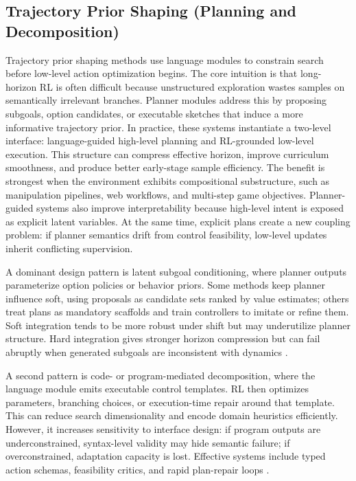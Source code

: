 \documentclass[pdflatex,sn-mathphys-num]{sn-jnl}
\begin{document}
\subsection{Trajectory Prior Shaping (Planning and Decomposition)}
Trajectory prior shaping methods use language modules to constrain search before low-level action optimization begins. The core intuition is that long-horizon RL is often difficult because unstructured exploration wastes samples on semantically irrelevant branches. Planner modules address this by proposing subgoals, option candidates, or executable sketches that induce a more informative trajectory prior. In practice, these systems instantiate a two-level interface: language-guided high-level planning and RL-grounded low-level execution. This structure can compress effective horizon, improve curriculum smoothness, and produce better early-stage sample efficiency. The benefit is strongest when the environment exhibits compositional substructure, such as manipulation pipelines, web workflows, and multi-step game objectives. Planner-guided systems also improve interpretability because high-level intent is exposed as explicit latent variables. At the same time, explicit plans create a new coupling problem: if planner semantics drift from control feasibility, low-level updates inherit conflicting supervision.

A dominant design pattern is latent subgoal conditioning, where planner outputs parameterize option policies or behavior priors. Some methods keep planner influence soft, using proposals as candidate sets ranked by value estimates; others treat plans as mandatory scaffolds and train controllers to imitate or refine them. Soft integration tends to be more robust under shift but may underutilize planner structure. Hard integration gives stronger horizon compression but can fail abruptly when generated subgoals are inconsistent with dynamics \cite{arxiv_p_2204_01691,arxiv_p_2405_01534,arxiv_p_2601_14140,arxiv_p_2510_24699}.

A second pattern is code- or program-mediated decomposition, where the language module emits executable control templates. RL then optimizes parameters, branching choices, or execution-time repair around that template. This can reduce search dimensionality and encode domain heuristics efficiently. However, it increases sensitivity to interface design: if program outputs are underconstrained, syntax-level validity may hide semantic failure; if overconstrained, adaptation capacity is lost. Effective systems include typed action schemas, feasibility critics, and rapid plan-repair loops \cite{doi_p_10_1109_icra48891_2023_10160591,arxiv_p_2303_16563,arxiv_p_2510_14967,arxiv_p_2602_07906}.
\end{document}
